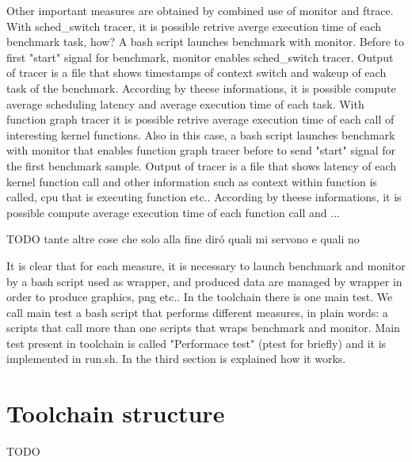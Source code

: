 \documentclass[a4paper,10pt]{article}
\begin{document}
\begin{multicols}{2}
Other important measures are obtained by combined use of monitor and ftrace.
With sched\_switch tracer, it is possible retrive averge execution time of each
benchmark task, how? A bash script launches benchmark with monitor. 
Before to first "start" signal for benchmark, monitor enables sched\_switch tracer. 
Output of  tracer is a file that shows timestamps of context switch and 
wakeup of each task of the benchmark. According by theese informations, it is possible 
compute average scheduling latency and average execution time of each task.
With function graph tracer it is possible retrive average execution time of each
call of interesting kernel functions. Also in this case, a bash script launches
benchmark with monitor that enables function graph tracer before to send "start" signal
for the first benchmark sample. Output of tracer is a file that shows latency of each
kernel function call and other information such as context within function is called,
cpu that is executing function etc..
According by theese informations, it is possible compute average execution time of each 
function call and ...

TODO tante altre cose che solo alla fine dir\'o quali mi servono e quali no

It is clear that for each measure, it is necessary to launch benchmark and monitor by 
a bash script used as wrapper, and produced data are managed by wrapper in order
to produce graphics, png etc..
In the toolchain there is one main test. We call main test a bash script that 
performs different measures, in plain words: a scripts that call more than one
scripts that wraps benchmark and monitor. Main test present in toolchain 
is called "Performace test" (ptest for briefly)
and it is implemented in run.sh. In the third section is explained how it works. 

\section{Toolchain structure}

TODO







\end{multicols}
\end{document}
